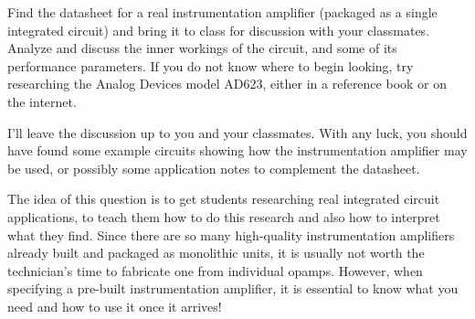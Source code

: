 

Find the datasheet for a real instrumentation amplifier (packaged as a single integrated circuit) and bring it to class for discussion with your classmates.  Analyze and discuss the inner workings of the circuit, and some of its performance parameters.  If you do not know where to begin looking, try researching the Analog Devices model AD623, either in a reference book or on the internet.







I'll leave the discussion up to you and your classmates.  With any luck, you should have found some example circuits showing how the instrumentation amplifier may be used, or possibly some application notes to complement the datasheet.







The idea of this question is to get students researching real integrated circuit applications, to teach them how to do this research and also how to interpret what they find.  Since there are so many high-quality instrumentation amplifiers already built and packaged as monolithic units, it is usually not worth the technician's time to fabricate one from individual opamps.  However, when specifying a pre-built instrumentation amplifier, it is essential to know what you need and how to use it once it arrives!




